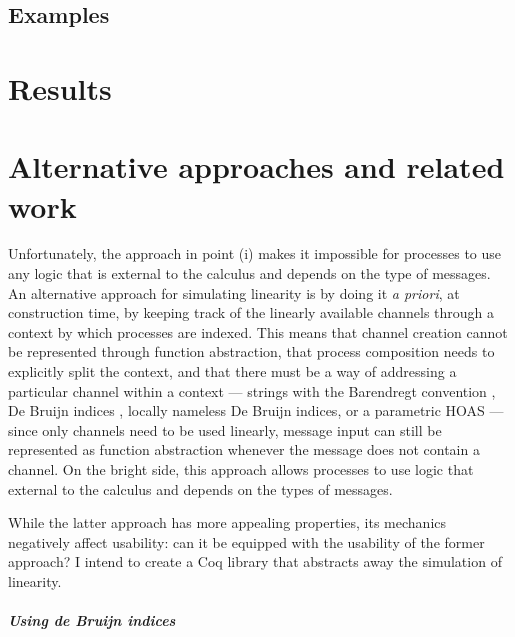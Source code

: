 \documentclass{mproj}
\begin{document}
\section{Examples}\label{examples}


\chapter{Results}\label{results}

\chapter{Alternative approaches and related work}\label{related-work}


Unfortunately, the approach in point (i) makes it impossible for processes to use any logic that is external to the calculus and depends on the type of messages. An alternative approach for simulating linearity is by doing it \emph{a priori}, at construction time, by keeping track of the linearly available channels through a context by which processes are indexed.  This means that channel creation cannot be represented through function abstraction, that process composition needs to explicitly split the context, and that there must be a way of addressing a particular channel within a context --- strings with the Barendregt convention \cite{Barendregt1984}, De Bruijn indices \cite{deBruijn1972}, locally nameless De Bruijn indices, or a parametric HOAS \cite{Chlipala2008} --- since only channels need to be used linearly, message input can still be represented as function abstraction whenever the message does not contain a channel. On the bright side, this approach allows processes to use logic that external to the calculus and depends on the types of messages.

While the latter approach has more appealing properties, its mechanics negatively affect usability: can it be equipped with the usability of the former approach? I intend to create a Coq library that abstracts away the simulation of linearity.

\paragraph{Using de Bruijn indices}
\end{document}
